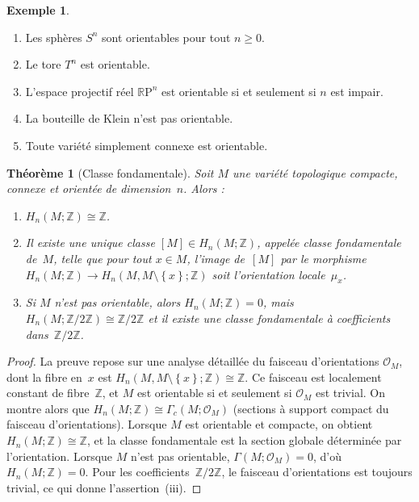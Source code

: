 \documentclass[12pt,a4paper,openany]{book}
\theoremstyle{definition}
\newtheorem{exemple}[definition]{Exemple}
\theoremstyle{plain}
\newtheorem{theoreme}[definition]{Théorème}
\theoremstyle{remark}
\newcommand{\Z}{\mathbb{Z}}
\newcommand{\RP}{\mathbb{R}\mathrm{P}}
\newcommand{\set}[1]{\left\{#1\right\}}
\begin{document}
\begin{exemple}\label{ex:orientabilite}
  \begin{enumerate}[label=(\roman*)]
    \item Les sphères $S^n$ sont orientables pour tout $n \geq 0$.
    \item Le tore $T^n$ est orientable.
    \item L'espace projectif réel $\RP^n$ est orientable si et seulement si $n$ est
          impair.
    \item La bouteille de Klein n'est pas orientable.
    \item Toute variété simplement connexe est orientable.
  \end{enumerate}
\end{exemple}

\begin{theoreme}[Classe fondamentale]\label{thm:classe-fondamentale}
  Soit $M$ une variété topologique compacte, connexe et orientée de dimension~$n$.
  Alors :
  \begin{enumerate}[label=(\roman*)]
    \item $H_n(M; \Z) \cong \Z$.
    \item Il existe une unique classe $[M] \in H_n(M; \Z)$, appelée
          \emph{classe fondamentale} de~$M$, telle que
          pour tout $x \in M$, l'image de~$[M]$ par le morphisme
          $H_n(M; \Z) \to H_n(M, M \setminus \set{x}; \Z)$
          soit l'orientation locale~$\mu_x$.
    \item Si $M$ n'est pas orientable, alors $H_n(M; \Z) = 0$, mais
          $H_n(M; \Z/2\Z) \cong \Z/2\Z$ et il existe une classe fondamentale à
          coefficients dans~$\Z/2\Z$.
  \end{enumerate}
\end{theoreme}

\begin{proof}
  La preuve repose sur une analyse détaillée du faisceau d'orientations
  $\mathcal{O}_M$, dont la fibre en~$x$ est $H_n(M, M \setminus \set{x}; \Z) \cong \Z$.
  Ce faisceau est localement constant de fibre~$\Z$, et $M$ est orientable si et
  seulement si $\mathcal{O}_M$ est trivial. On montre alors que
  $H_n(M; \Z) \cong \Gamma_c(M; \mathcal{O}_M)$
  (sections à support compact du faisceau d'orientations). Lorsque $M$ est orientable
  et compacte, on obtient $H_n(M; \Z) \cong \Z$, et la classe fondamentale est la
  section globale déterminée par l'orientation. Lorsque $M$ n'est pas orientable,
  $\Gamma(M; \mathcal{O}_M) = 0$, d'où $H_n(M; \Z) = 0$. Pour les
  coefficients~$\Z/2\Z$, le faisceau d'orientations est toujours trivial, ce qui
  donne l'assertion~(iii).
\end{proof}
\end{document}
